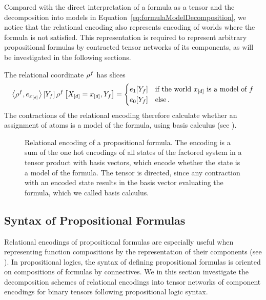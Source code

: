 Compared with the direct interpretation of a formula as a tensor and the decomposition into models in Equation~\ref{eq:formulaModelDecomposition}, we notice that the relational encoding also represents encoding of worlds where the formula is not satisfied.
This representation is required to represent arbitrary propositional formulas by contracted tensor networks of its components, as will be investigated in the following sections.


The relational coordinate $\rho^{f}$ has slices
\begin{align}
	\left\langle \rho^{f},e_{x_{[d]}}\right\rangle \left[ Y_{f} \right] 
		\rho^{f}\left[X_{[d]}=x_{[d]},Y_{f}\right]
	= \begin{cases}
		e_1[Y_{f}] & \text{if the world $x_{[d]}$ is a model of $f$}  \\
		e_0[Y_{f}] & \text{else}\, .
		\end{cases}
\end{align} 
The contractions of the relational encoding therefore calculate whether an assignment of atoms is a model of the formula, using basis calculus (see ).

\begin{figure}[h]
\begin{center}
	
\end{center}
\caption{Relational encoding of a propositional formula. 
The encoding is a sum of the one hot encodings of all states of the factored system in a tensor product with basis vectors, which encode whether the state is a model of the formula.
The tensor is directed, since any contraction with an encoded state results in the basis vector evaluating the formula, which we called basis calculus.
}
\label{fig:formulaRencoding} 
\end{figure}










\subsection{Syntax of Propositional Formulas}

Relational encodings of propositional formulas are especially useful when representing function compositions by the representation of their components (see ).
In propositional logics, the syntax of defining propositional formulas is oriented on compositions of formulas by connectives. %
We in this section investigate the decomposition schemes of relational encodings into tensor networks of component encodings for binary tensors following propositional logic syntax.

